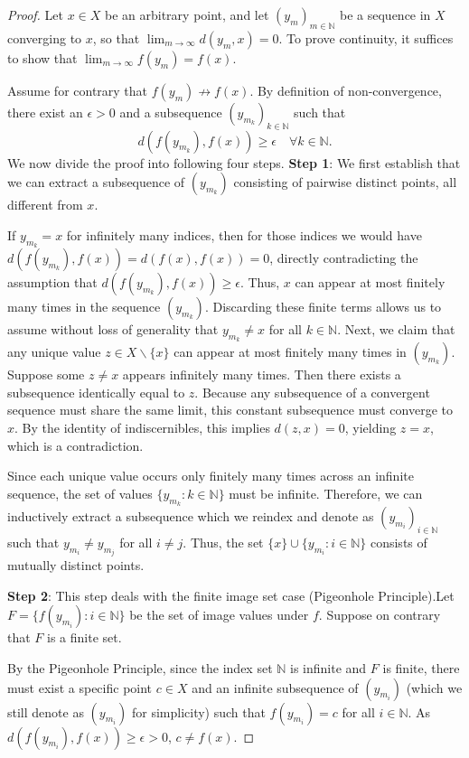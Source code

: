 \documentclass[10pt,a4paper]{amsart}
\begin{document}
\begin{proof}
Let $x\in X$ be an arbitrary point, and let $(y_{m})_{m\in \mathbb{N}}$ be a sequence in $X$ converging to $x$, so that $\lim_{m\to \infty}d(y_{m},x) = 0$. To prove continuity, it suffices to show that $\lim_{m\to \infty}f(y_{m}) = f(x)$.

Assume for contrary that $f(y_{m})\not\to f(x)$. By definition of non-convergence, there exist an $\epsilon >0$ and a subsequence $(y_{m_k})_{k\in \mathbb{N}}$ such that
\[
d(f(y_{m_k}),f(x))\geq \epsilon \quad \forall k\in \mathbb{N}.
\]
We now divide the proof into following four steps.\newline
\textbf{Step 1}:  We first establish that we can extract a subsequence of $(y_{m_k})$ consisting of pairwise distinct points, all different from $x$.

If $y_{m_k} = x$ for infinitely many indices, then for those indices we would have $d(f(y_{m_k}),f(x)) = d(f(x),f(x)) = 0$, directly contradicting the assumption that $d(f(y_{m_k}),f(x))\geq \epsilon$. Thus, $x$ can appear at most finitely many times in the sequence $(y_{m_k})$. Discarding these finite terms allows us to assume without loss of generality that $y_{m_k}\neq x$ for all $k\in \mathbb{N}$. Next, we claim that any unique value $z\in X\backslash \{x\}$ can appear at most finitely many times in $(y_{m_k})$. Suppose some $z\neq x$ appears infinitely many times. Then there exists a subsequence identically equal to $z$. Because any subsequence of a convergent sequence must share the same limit, this constant subsequence must converge to $x$. By the identity of indiscernibles, this implies $d(z,x) = 0$, yielding $z = x$, which is a contradiction.

Since each unique value occurs only finitely many times across an infinite sequence, the set of values $\{y_{m_k}:k\in \mathbb{N}\}$ must be infinite. Therefore, we can inductively extract a subsequence which we reindex and denote as $(y_{m_i})_{i\in \mathbb{N}}$ such that $y_{m_i}\neq y_{m_j}$ for all $i\neq j$. Thus, the set $\{x\} \cup \{y_{m_i}:i\in \mathbb{N}\}$ consists of mutually distinct points.

\textbf{Step 2}: This step deals with the finite image set case (Pigeonhole Principle).\newline Let $F = \{f(y_{m_i}):i\in \mathbb{N}\}$ be the set of image values under $f$. Suppose on contrary that $F$ is a finite set.

By the Pigeonhole Principle, since the index set $\mathbb{N}$ is infinite and $F$ is finite, there must exist a specific point $c\in X$ and an infinite subsequence of $(y_{m_i})$ (which we still denote as $(y_{m_i})$ for simplicity) such that $f(y_{m_i}) = c$ for all $i\in \mathbb{N}$. As $d(f(y_{m_i}),f(x))\geq \epsilon >0$, $c\neq f(x)$.


\end{proof}
\end{document}
